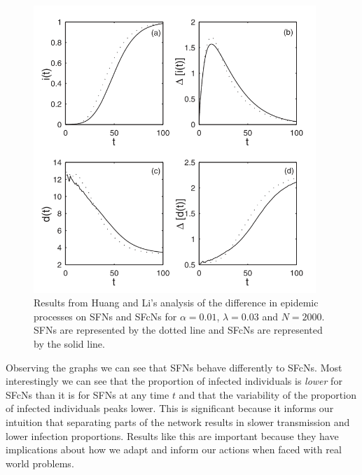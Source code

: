 \begin{figure}
    \begin{center}
        \includegraphics[width=0.95\textwidth]{img/si}
    \end{center}
    \caption{Results from Huang and Li's analysis of the difference in epidemic processes on SFNs and SFcNs for $\alpha = 0.01$, $\lambda = 0.03$ and $N = 2000$. SFNs are represented by the dotted line and SFcNs are represented by the solid line.}
    \label{fig:si}
\end{figure}

Observing the graphs we can see that SFNs behave differently to SFcNs. Most interestingly we can see that the proportion of infected individuals is \emph{lower} for SFcNs than it is for SFNs at any time $t$ and that the variability of the proportion of infected individuals peaks lower. This is significant because it informs our intuition that separating parts of the network results in slower transmission and lower infection proportions. Results like this are important because they have implications about how we adapt and inform our actions when faced with real world problems.
